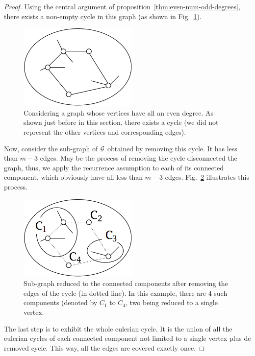 \begin{proof}
Using the central argument of proposition~\ref{thm:even-num-odd-degrees},
there exists a non-empty cycle in this graph (as shown in Fig.~\ref{fig:eulerianProof1}). 
\begin{figure}[hbt]
\begin{center}
       \includegraphics[scale=0.5]{FiguresGraph/EulerianProof1}
       \caption{Considering a graph whose vertices have all an even degree.
       As shown just before in this section, there exists a cycle (we did not represent the other vertices and corresponding edges).}
  \label{fig:eulerianProof1}
\end{center}
\end{figure}
Now, consider the sub-graph of $\mbox{$\cal G$}$ obtained by removing this cycle.
It has less than $m-3$ edges.
May be the process of removing the cycle disconnected the graph, thus, we apply
the recurrence assumption to each of its connected component,
which obviously have all less than $m-3$ edges.
Fig.~\ref{fig:eulerianProof2} illustrates this process. 
\begin{figure}[hbt]
\begin{center}
       \includegraphics[scale=0.5]{FiguresGraph/EulerianProof2}
       \caption{Sub-graph reduced to the connected components after removing the edges of the cycle
       (in dotted line).
       In this example, there are 4 such components (denoted by $C_1$ to $C_4$, two being reduced to a single vertex.}
  \label{fig:eulerianProof2}
\end{center}
\end{figure}
The last step is to exhibit the whole eulerian cycle.
It is the union of all the eulerian cycles of each connected component not limited to a single vertex
plus de removed cycle.
This way, all the edges are covered exactly once. 
\medskip


\end{proof}
